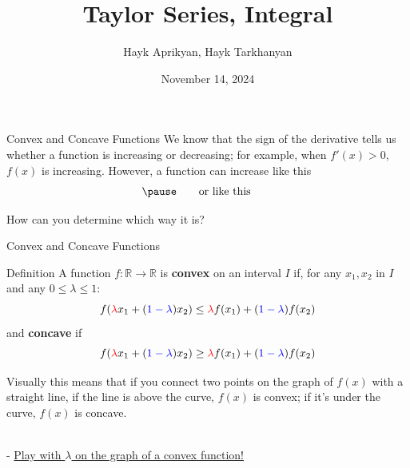 \documentclass{beamer}
\title[Lecture 6]{Taylor Series, Integral}
\author[Aprikyan, Tarkhanyan]{Hayk Aprikyan, Hayk Tarkhanyan}
\institute[ACA]{Armenian Code Academy}
\date{November 14, 2024}
\begin{document}
\begin{frame}
  \titlepage
\end{frame}


\begin{frame}{Convex and Concave Functions}
    We know that the sign of the derivative tells us whether a function is increasing or decreasing; for example, when \(f'(x) > 0\), \(f(x)\) is increasing. \pause However, a function can increase like this
    \[
  \pause \qquad\text{or like this} \qquad 
\]

\pause 
How can you determine which way it is?

\end{frame}



\begin{frame}{Convex and Concave Functions}
    \begin{block}{Definition}
        A function $f: \mathbb{R} \to \mathbb{R}$ is \textbf{convex} on an interval $I$ if, for any $x_1, x_2$ in $I$ and any $0 \le \lambda \le 1$:
        \[
        f(\textcolor{red}{\lambda} x_1 + (\textcolor{blue}{1-\lambda})x_2) \leq \textcolor{red}{\lambda} f(x_1) + (\textcolor{blue}{1-\lambda}) f(x_2)
        \] \pause
        and \textbf{concave} if
        \[
        f(\textcolor{red}{\lambda} x_1 + (\textcolor{blue}{1-\lambda})x_2) \ge \textcolor{red}{\lambda} f(x_1) + (\textcolor{blue}{1-\lambda}) f(x_2)
        \]
    \end{block}
    Visually this means that if you connect two points on the graph of $f(x)$ with a straight line, if the line is above the curve, $f(x)$ is convex; if it's under the curve, $f(x)$ is concave.
    \linebreak
    
    \\



- \color{blue} \href{https://www.geogebra.org/classic/pn5xhfnr}{Play with $\lambda$ on the graph of a convex function!}

  \end{frame}
\end{document}
